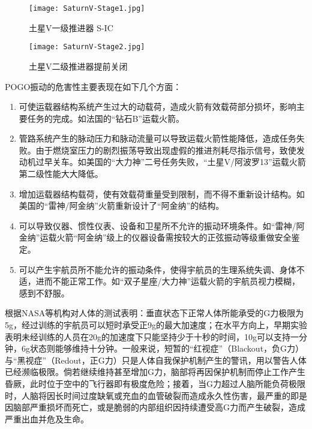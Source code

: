\begin{figure}[t]
  \begin{center}
  \begin{minipage}{.47\linewidth}
    \texttt{[image: SaturnV-Stage1.jpg]}
    \caption{土星V一级推进器 S-IC}\label{SaturnV-Stage1}
  \end{minipage}
  \begin{minipage}{.47\linewidth}
    \texttt{[image: SaturnV-Stage2.jpg]}
    \caption{土星V二级推进器提前关闭}\label{SaturnV-Stage2}
  \end{minipage}
\end{center}
\end{figure}

POGO振动的危害性主要表现在如下几个方面\cite{Rubin:1970, Wang-Qizheng:1999}：
\begin{enumerate}[leftmargin=\parindent, align=parleft, labelindent=0pt, labelwidth=*]
\item 可使运载器结构系统产生过大的动载荷，造成火箭有效载荷部分损坏，影响主要任务的完成。如法国的“钻石B”运载火箭。
\item 管路系统产生的脉动压力和脉动流量可以导致运载火箭性能降低，造成任务失败。由于燃烧室压力的剧烈振荡导致出现虚假的推进剂耗尽指示信号，致使发动机过早关车。如美国的“大力神”二号任务失败，“土星V/阿波罗13”运载火箭第二级性能大大降低。
\item 增加运载器结构载荷，使有效载荷重量受到限制，而不得不重新设计结构。如美国的“雷神/阿金纳”火箭重新设计了“阿金纳”的结构。
\item 可以导致仪器、惯性仪表、设备和卫星所不允许的振动环境条件。如“雷神/阿金纳”运载火箭“阿金纳”级上的仪器设备需按较大的正弦振动等级重做安全鉴定。
\item 可以产生宇航员所不能允许的振动条件，使得宇航员的生理系统失调、身体不适，进而不能正常工作。如“双子星座/大力神”运载火箭的宇航员视力模糊，感到不舒服。
\end{enumerate}

根据NASA等机构对人体的测试表明\cite{Creer:1960, Burton:1988, Davis:2008}：垂直状态下正常人体所能承受的G力极限为5g，经过训练的宇航员可以短时承受正9g的最大加速度；在水平方向上，早期实验表明未经训练的人员在20g的加速度下只能坚持少于十秒的时间，10g可以支持一分钟，6g状态则能够维持十分钟。一般来说，短暂的“红视症”（Blackout，负G力）与“黑视症”（Redout，正G力）只是人体自我保护机制产生的警讯，用以警告人体已经濒临极限。倘若继续维持甚至增加G力，脑部将再因保护机制而停止工作产生昏厥，此时位于空中的飞行器即有极度危险；接着，当G力超过人脑所能负荷极限时，人脑将因长时间过度缺氧或充血的血管破裂而造成永久性伤害，最严重的即是因脑部严重损坏而死亡，或是脆弱的内部组织因持续遭受高G力而产生破裂，造成严重出血并危及生命。

